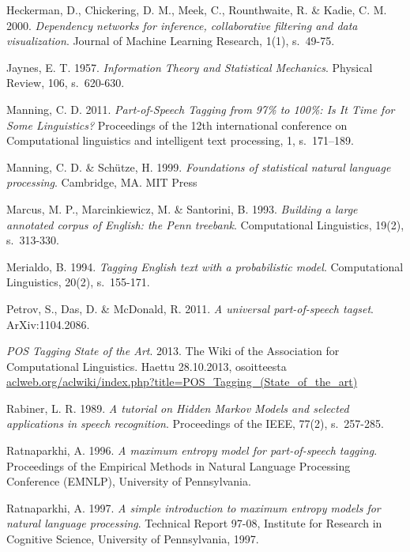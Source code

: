 \documentclass[utf8,bachelor,manualbib]{gradu3}
\begin{document}
\begin{thebibliography}{}
Heckerman, D., Chickering, D. M., Meek, C., Rounthwaite, R. \& Kadie, C. M. 2000. \textit{Dependency networks for inference, collaborative filtering and data visualization}.
Journal of Machine Learning Research, 1(1), s.~49-75.

Jaynes, E. T. 1957. \textit{Information Theory and Statistical Mechanics}. Physical Review, 106, s.~620-630.

Manning, C. D. 2011. \textit{Part-of-Speech Tagging from 97\% to 100\%: Is It Time for Some Linguistics?} Proceedings of the 12th international conference on Computational linguistics and intelligent text processing, 1, s.~171--189.

Manning, C. D. \& Sch\"{u}tze, H. 1999. \textit{Foundations of statistical natural language processing}.
Cambridge, MA. MIT Press

Marcus, M. P., Marcinkiewicz, M. \& Santorini, B. 1993. \textit{Building a large annotated corpus of English: the Penn treebank}. Computational Linguistics, 19(2), s.~313-330.

Merialdo, B. 1994. \textit{Tagging English text with a probabilistic model}. Computational Linguistics, 20(2), s.~155-171.

Petrov, S., Das, D. \& McDonald, R. 2011. \textit{A universal part-of-speech tagset}. ArXiv:1104.2086.

\textit{POS Tagging State of the Art}. 2013. The Wiki of the Association for Computational Linguistics.
Haettu 28.10.2013, osoitteesta \url{aclweb.org/aclwiki/index.php?title=POS_Tagging_(State_of_the_art)}

Rabiner, L. R. 1989. \textit{A tutorial on Hidden Markov Models and selected applications in speech recognition}. Proceedings of the IEEE, 77(2), s.~257-285.

Ratnaparkhi, A. 1996. \textit{A maximum entropy model for part-of-speech tagging}. Proceedings of the Empirical Methods in Natural Language Processing Conference (EMNLP), University of Pennsylvania.

Ratnaparkhi, A. 1997. \textit{ A simple introduction to maximum entropy models for natural language processing}.
Technical Report 97-08, Institute for Research in Cognitive Science, University of Pennsylvania, 1997.


\end{thebibliography}
\end{document}
